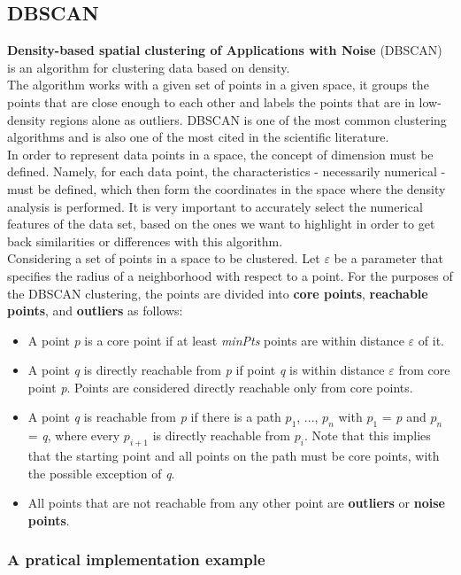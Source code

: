     
    \subsection{DBSCAN}
    \textbf{Density-based spatial clustering of Applications with Noise} (DBSCAN) is an algorithm for clustering data based on density.
    \\
    The algorithm works with a given set of points in a given space, it groups the points that are close enough to each other and labels the points that are in low-density regions alone as outliers. DBSCAN is one of the most common clustering algorithms and is also one of the most cited in the scientific literature.
    \\
    In order to represent data points in a space, the concept of dimension must be defined. Namely, for each data point, the characteristics - necessarily numerical - must be defined, which then form the coordinates in the space where the density analysis is performed. It is very important to accurately select the numerical features of the data set, based on the ones we want to highlight in order to get back similarities or differences with this algorithm.
    \\
    Considering a set of points in a space to be clustered. Let $\varepsilon$ be a parameter that specifies the radius of a neighborhood with respect to a point.
    For the purposes of the DBSCAN clustering, the points are divided into \textbf{core points}, \textbf{reachable points}, and \textbf{outliers} as follows:
        
    \begin{itemize}
    \item A point \textit{p} is a core point if at least \textit{minPts} points are within distance $\varepsilon$ of it.
    \item A point \textit{q} is directly reachable from \textit{p} if point \textit{q} is within distance $\varepsilon$ from core point \textit{p}. Points are considered directly reachable only from core points.
    \item A point \textit{q} is reachable from \textit{p} if there is a path \textit{$p_1$}, ..., \textit{$p_n$} with \textit{$p_1$} = \textit{p} and \textit{$p_n$} = \textit{q}, where every \textit{$p_{i+1}$} is directly reachable from \textit{$p_i$}. Note that this implies that the starting point and all points on the path must be core points, with the possible exception of \textit{q}.
    \item All points that are not reachable from any other point are \textbf{outliers} or \textbf{noise points}.
    \end{itemize}
    
    
    \subsubsection{A pratical implementation example}
    
